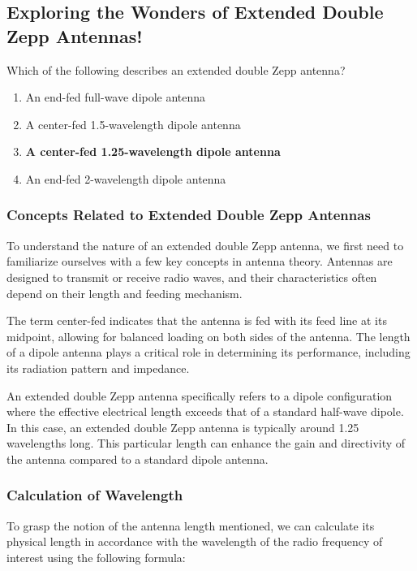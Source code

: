 \subsection{Exploring the Wonders of Extended Double Zepp Antennas!}

\begin{tcolorbox}[colback=gray!10, colframe=black, title=E9C12] Which of the following describes an extended double Zepp antenna?
\begin{enumerate}[label=\Alph*.]
    \item An end-fed full-wave dipole antenna
    \item A center-fed 1.5-wavelength dipole antenna
    \item \textbf{A center-fed 1.25-wavelength dipole antenna}
    \item An end-fed 2-wavelength dipole antenna
\end{enumerate} \end{tcolorbox}

\subsubsection{Concepts Related to Extended Double Zepp Antennas}

To understand the nature of an extended double Zepp antenna, we first need to familiarize ourselves with a few key concepts in antenna theory. Antennas are designed to transmit or receive radio waves, and their characteristics often depend on their length and feeding mechanism.

The term center-fed indicates that the antenna is fed with its feed line at its midpoint, allowing for balanced loading on both sides of the antenna. The length of a dipole antenna plays a critical role in determining its performance, including its radiation pattern and impedance.

An extended double Zepp antenna specifically refers to a dipole configuration where the effective electrical length exceeds that of a standard half-wave dipole. In this case, an extended double Zepp antenna is typically around 1.25 wavelengths long. This particular length can enhance the gain and directivity of the antenna compared to a standard dipole antenna.

\subsubsection{Calculation of Wavelength}

To grasp the notion of the antenna length mentioned, we can calculate its physical length in accordance with the wavelength of the radio frequency of interest using the following formula:

